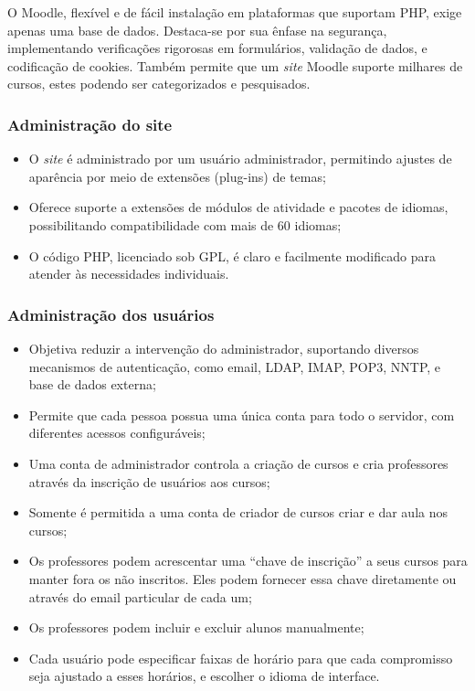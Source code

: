 O Moodle, flexível e de fácil instalação em plataformas que suportam PHP, exige apenas uma base de dados. Destaca-se por sua ênfase na segurança, implementando verificações rigorosas em formulários, validação de dados, e codificação de cookies. Também permite que um \textit{site} Moodle suporte milhares de cursos, estes podendo ser categorizados e pesquisados.

\subsubsection{Administração do site}

\begin{itemize}
    \item O \textit{site} é administrado por um usuário administrador, permitindo ajustes de aparência por meio de extensões (plug-ins) de temas;
    \item Oferece suporte a extensões de módulos de atividade e pacotes de idiomas, possibilitando compatibilidade com mais de 60 idiomas; 
    \item O código PHP, licenciado sob GPL, é claro e facilmente modificado para atender às necessidades individuais.
\end{itemize}

\subsubsection{Administração dos usuários}

\begin{itemize}
    \item Objetiva reduzir a intervenção do administrador, suportando diversos mecanismos de autenticação, como email, LDAP, IMAP, POP3, NNTP, e base de dados externa;
    \item Permite que cada pessoa possua uma única conta para todo o servidor, com diferentes acessos configuráveis; 
    \item Uma conta de administrador controla a criação de cursos e cria professores através da inscrição de usuários aos cursos;
    \item Somente é permitida a uma conta de criador de cursos criar e dar aula nos cursos;
    \item Os professores podem acrescentar uma “chave de inscrição” a seus cursos para manter fora os não inscritos. Eles podem fornecer essa chave diretamente ou através do email particular de cada um;
    \item Os professores podem incluir e excluir alunos manualmente;
    \item Cada usuário pode especificar faixas de horário para que cada compromisso seja ajustado a esses horários, e escolher o idioma de interface.
\end{itemize}

